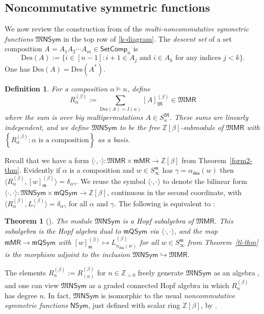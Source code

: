 \documentclass[11pt]{article}
\newtheorem{definition}[theo]{Definition}
\newtheorem{theorem}[theo]{Theorem}
\theoremstyle{definition}
\numberwithin{equation}{section}
\numberwithin{equation}{section}
\newcommand{\ZZ}{\mathbb{Z}}
\newcommand{\fk}{\mathfrak}
\newcommand{\Des}{\mathrm{Des}}
\newcommand{\NSym}{\mathsf{NSym}}
\newcommand{\MNSym}{\mathfrak{M}\mathsf{NSym}}
\newcommand{\MMPR}{\mathfrak{M}\mathsf{MR}}
\newcommand{\mMPR}{\mathfrak{m}\mathsf{MR}}
\newcommand{\SetComp}{\mathsf{SetComp}}
\newcommand{\tR}{R^{(\beta)}}
\newcommand{\mQSym}{\mathfrak{m}\mathsf{QSym}}
\newcommand{\Sm}{S^{\fk m}}
\newcommand{\SM}{S^{\fk M}}
\newcommand{\m}{\mathfrak{m}}
\newcommand{\M}{\mathfrak{M}}
\newcommand{\PP}{\ZZ_{>0}}
\newcommand{\cC}{\alpha_{\mathsf{des}}}
\newcommand{\defn}[1]{{\color{darkred}\emph{#1}}}
\begin{document}
 

\subsection{Noncommutative symmetric functions}

We now review the construction from \cite{LamPyl} of the  \defn{multi-noncommutative symmetric functions} $\MNSym$
 in the top row of \eqref{k-diagram}.
%
The \defn{descent set} of a set composition $A = A_1 A_2\cdots A_m \in \SetComp_n$
is 
\[\Des(A) := \{ i  \in [n-1]: i+1 \in A_j\text{ and }i \in A_k\text{ for any indices }j<k\}.\]
One has $\Des(A) = \Des(A^*)$.

\begin{definition}
For a composition $\alpha \vDash n$,
define
\[
\tR_\alpha := \sum_{\Des(A) =I(\alpha) } [A]^{(\beta)}_\M \in \MMPR
\]
where the sum is over big multipermutations $A \in \SM_n$.
These sums are linearly independent, and we
 define $\MNSym$ to be the free $\ZZ[\beta]$-submodule of $\MMPR$
with $\left\{\tR_\alpha : \alpha \text{ is a composition} \right\}$ as a basis.
\end{definition}

 

Recall that we have a form 
$\langle\cdot,\cdot\rangle : \MMPR \times \mMPR\to \ZZ[\beta]$
from Theorem~\ref{form2-thm}.
Evidently if $\alpha$ is a composition and $w \in \Sm_\infty$ has $\gamma = \cC(w)$  
then  $\langle \tR_{\alpha},[w]^{(\beta)}_\m\rangle= \delta_{\alpha\gamma}$.
We reuse the symbol $\langle \cdot,\cdot\rangle $ 
to denote the bilinear form $\langle \cdot,\cdot\rangle : \MNSym \times \mQSym \to \ZZ[\beta]$, continuous in the second coordinate,
 with
$ \langle \tR_{\alpha}, L^{(\beta)}_{\gamma} \rangle = \delta_{\alpha\gamma}$ for all $\alpha$ and $\gamma$.
The following is equivalent to \cite[Thm.~8.4]{LamPyl}:


\begin{theorem}[{\cite{LamPyl}}]
\label{form3-thm}
The module $\MNSym$ is a Hopf subalgebra of $\MMPR$. This subalgebra is the Hopf algebra 
dual to $\mQSym$ via $\langle \cdot,\cdot\rangle $, and the  map $\mMPR \to \mQSym$ 
with 
 $[w]^{(\beta)}_\m \mapsto L^{(\beta)}_{\cC(w)}$ for all $w \in \Sm_\infty$
from Theorem~\ref{tl-thm}
is the morphism adjoint to 
the inclusion
$\MNSym \hookrightarrow \MMPR$.
\end{theorem}


The elements $\tR_{n}:=\tR_{(n)}$ for $n \in \PP$
 freely generate $\MNSym$ as an algebra \cite[Prop.~8.3]{LamPyl},
and one can view $\MNSym$ as a graded connected Hopf algebra in which $\tR_{n}$ has degree $n$.
 In fact, $\MNSym$ is
isomorphic to the usual  \defn{noncommutative symmetric functions} $\NSym$, just defined with scalar ring $\ZZ[\beta]$, by
 \cite[Prop.~8.5]{LamPyl}.
\end{document}
